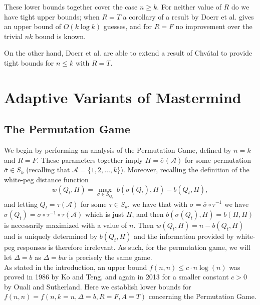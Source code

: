 \documentclass[12pt, a4paper]{article}
\newcommand{\inv}{^{-1}}              %
\begin{document}
These lower bounds together cover the case $n \geq k$. For neither value of $R$ do we have tight upper bounds; when $R = T$ a corollary of a result by Doerr et al. \cite{DS13} gives an upper bound of $O(k \log k)$ guesses, and for $R = F$ no improvement over the trivial $nk$ bound is known.

On the other hand, Doerr et al. are able to extend a result of Chv\'atal to provide tight bounds for $n \le k$ with $R = T$. 

\section{Adaptive Variants of Mastermind}
\subsection{The Permutation Game}
We begin by performing an analysis of the Permutation Game, defined by $n=k$ and $R=F$. These parameters together imply $H=\overline{\sigma}(\mathcal{A})$ for some permutation $\overline{\sigma}\in S_k$ (recalling that $\mathcal{A}=\{1,2,\ldots, k\}$). Moreover, recalling the definition of the white-peg distance function
\begin{equation*}
w(Q_t, H) = \max_{\sigma\in S_{Q_t}}~b(\sigma(Q_t), H) - b(Q_t, H),
\end{equation*}
and letting $Q_t = \tau(\mathcal{A})$ for some $\tau \in S_k$, we have that with $\sigma = \overline{\sigma}\circ \tau\inv$ we have $\sigma(Q_t) = \overline{\sigma}\circ\tau\inv\circ\tau(\mathcal A)$ which is just $H$, and then $b(\sigma(Q_t),H) = b(H,H)$  is necessarily maximized with a value of $n$. Then $w(Q_t,H) = n - b(Q_t,H)$ and is uniquely determined by $b(Q_t,H)$ and the information provided by white-peg responses is therefore irrelevant. As such, for the permutation game, we will let $\Delta = b$ as $\Delta = bw$ is precisely the same game. \\
 As stated in the introduction, an upper bound $f(n, n)\le c\cdot n\log(n)$ was proved in 1986 by Ko and Teng, and again in 2013 for a smaller constant $c>0$ by Ouali and Sutherland. Here we establish lower bounds for $f(n, n) = f(n, k=n, \Delta=b, R=F, A=T)$ concerning the Permutation Game.
\end{document}
